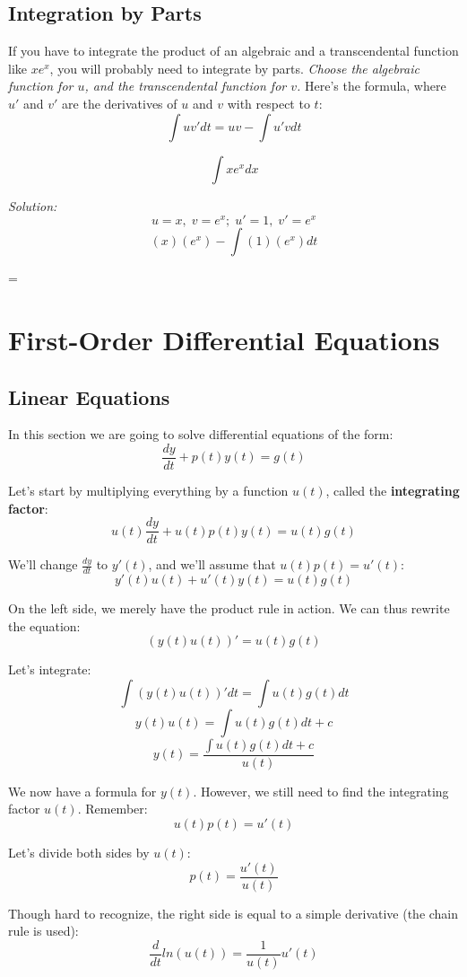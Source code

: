 \subsection{Integration by Parts}
If you have to integrate the product of an algebraic and a transcendental function like $xe^{x}$, you will probably need to integrate by parts. \textit{Choose the algebraic function for $u$, and the transcendental function for $v$.} Here's the formula, where $u'$ and $v'$ are the derivatives of $u$ and $v$ with respect to $t$:
$$\int uv'dt = uv - \int u'vdt$$

\color{orange}{Let's do a quick example. Integrate:}
$$\int xe^{x}dx$$

\pagebreak

\textit{Solution:}
$$u = x,\; v = e^{x};\; u' = 1,\; v' = e^{x}$$
$$(x)(e^{x}) - \int (1)(e^{x})dt$$
\begin{center}
	= 
\end{center}

\section{First-Order Differential Equations}
\subsection{Linear Equations}
In this section we are going to solve differential equations of the form: $$\frac{dy}{dt} + p(t)y(t) = g(t)$$

Let's start by multiplying everything by a function $u(t)$, called the \textbf{integrating factor}: $$u(t)\frac{dy}{dt} + u(t)p(t)y(t) = u(t)g(t)$$

We'll change $\frac{dy}{dt}$ to $y'(t)$, and we'll assume that $u(t)p(t)=u'(t)$: $$y'(t)u(t) + u'(t)y(t) = u(t)g(t)$$

On the left side, we merely have the product rule in action. We can thus rewrite the equation: $$(y(t)u(t))' = u(t)g(t)$$

Let's integrate:
$$\int (y(t)u(t))'dt = \int u(t)g(t)dt$$
$$y(t)u(t) = \int u(t)g(t)dt + c$$
$$y(t) = \frac{\int u(t)g(t)dt + c}{u(t)}$$

We now have a formula for $y(t)$. However, we still need to find the integrating factor $u(t)$. Remember: $$u(t)p(t)=u'(t)$$

Let's divide both sides by $u(t)$: $$p(t) = \frac{u'(t)}{u(t)}$$

Though hard to recognize, the right side is equal to a simple derivative (the chain rule is used):
$$\frac{d}{dt}ln(u(t)) = \frac{1}{u(t)}u'(t)$$

